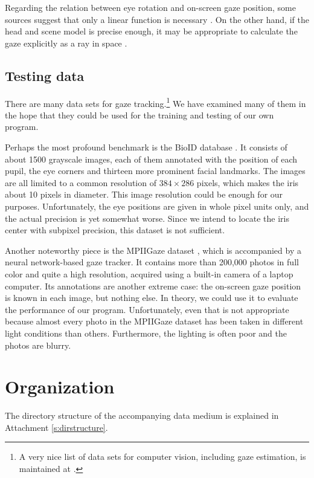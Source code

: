 Regarding the relation between eye rotation and on-screen gaze position, some sources suggest that only a linear function is necessary \cite{zhu12}.
On the other hand, if the head and scene model is precise enough, it may be appropriate to calculate the gaze explicitly as a ray in space \cite{wang16}.

\subsection{Testing data}

There are many data sets for gaze tracking.\footnote{
A very nice list of data sets for computer vision, including gaze estimation, is maintained at .
}
We have examined many of them in the hope that they could be used for the training and testing of our own program.

Perhaps the most profound benchmark is the BioID database \cite{bioid}.
It consists of about 1500 grayscale images, each of them annotated with the position of each pupil, the eye corners and thirteen more prominent facial landmarks.
The images are all limited to a common resolution of $384\times286$ pixels, which makes the iris about 10 pixels in diameter.
This image resolution could be enough for our purposes.
Unfortunately, the eye positions are given in whole pixel units only, and the actual precision is yet somewhat worse.
Since we intend to locate the iris center with subpixel precision, this dataset is not sufficient.

Another noteworthy piece is the MPIIGaze dataset \cite{mpiigaze}, which is accompanied by a neural network-based gaze tracker.
It contains more than 200,000 photos in full color and quite a high resolution, acquired using a built-in camera of a laptop computer.
Its annotations are another extreme case: the on-screen gaze position is known in each image, but nothing else.
In theory, we could use it to evaluate the performance of our program.
Unfortunately, even that is not appropriate because almost every photo in the MPIIGaze dataset has been taken in different light conditions than others.
Furthermore, the lighting is often poor and the photos are blurry.

\section{Organization}

The directory structure of the accompanying data medium is explained in Attachment \ref{s:dirstructure}.

